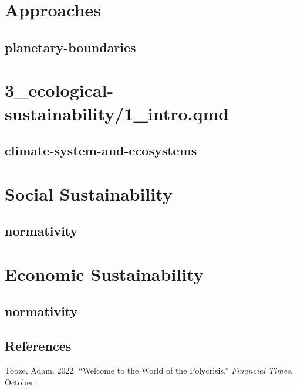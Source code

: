 \documentclass[
  letterpaper,
  DIV=11,
  numbers=noendperiod]{scrreprt}
\newlength{\cslhangindent}
\newenvironment{CSLReferences}[2] %
 {\begin{list}{}{%
  \setlength{\itemindent}{0pt}
  \setlength{\leftmargin}{0pt}
  \setlength{\parsep}{0pt}
  \ifodd #1
   \setlength{\leftmargin}{\cslhangindent}
   \setlength{\itemindent}{-1\cslhangindent}
  \fi
  \setlength{\itemsep}{#2\baselineskip}}}
 {\end{list}}
\begin{document}
\part{Approaches}

\chapter{planetary-boundaries}\label{planetary-boundaries}

\part{3\_ecological-sustainability/1\_intro.qmd}

\chapter{climate-system-and-ecosystems}\label{climate-system-and-ecosystems}

\part{Social Sustainability}

\chapter{normativity}\label{normativity}

\part{Economic Sustainability}

\chapter{normativity}\label{normativity-1}

\cleardoublepage
{}
{}
\appendix

\chapter*{References}\label{references}


\label{refs}
\begin{CSLReferences}{1}{0}
Tooze, Adam. 2022. {``Welcome to the World of the Polycrisis.''}
\emph{Financial Times}, October.

\end{CSLReferences}
\end{document}
